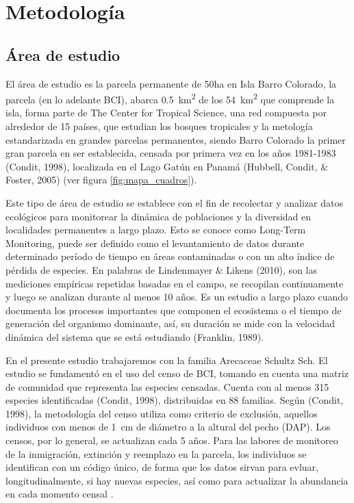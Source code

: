 \documentclass[11pt,]{article}
\begin{document}
\section{Metodología}\label{metodologuxeda}

\subsection{Área de estudio}\label{uxe1rea-de-estudio}

El área de estudio es la parcela permanente de 50ha en Isla Barro
Colorado, la parcela (en lo adelante BCI), abarca
0.5~km\textsuperscript{2} de los 54~km\textsuperscript{2} que comprende
la isla, forma parte de The Center for Tropical Science, una red
compuesta por alrededor de 15 países, que estudian los bosques
tropicales y la metología estandarizada en grandes parcelas permanentes,
siendo Barro Colorado la primer gran parcela en ser establecida, censada
por primera vez en los años 1981-1983 (Condit, 1998), localizada en el
Lago Gatún en Panamá (Hubbell, Condit, \& Foster, 2005) (ver figura
\ref{fig:mapa_cuadros}).

Este tipo de área de estudio se establece con el fin de recolectar y
analizar datos ecológicos para monitorear la dinámica de poblaciones y
la diversidad en localidades permanentes a largo plazo. Esto se conoce
como Long-Term Monitoring, puede ser definido como el levantamiento de
datos durante determinado período de tiempo en áreas contaminadas o con
un alto índice de pérdida de especies. En palabras de Lindenmayer \&
Likens (2010), son las mediciones empíricas repetidas basadas en el
campo, se recopilan continuamente y luego se analizan durante al menos
10 años. Es un estudio a largo plazo cuando documenta los procesos
importantes que componen el ecosistema o el tiempo de generación del
organismo dominante, así, su duración se mide con la velocidad dinámica
del sistema que se está estudiando (Franklin, 1989).

En el presente estudio trabajaremos con la familia Arecaceae Schultz
Sch. El estudio se fundamentó en el uso del censo de BCI, tomando en
cuenta una matriz de comunidad que representa las especies censadas.
Cuenta con al menos 315 especies identificadas (Condit, 1998),
distribuidas en 88 familias. Según (Condit, 1998), la metodología del
censo utiliza como criterio de exclusión, aquellos individuos con menos
de 1~cm de diámetro a la altural del pecho (DAP). Los censos, por lo
general, se actualizan cada 5 años. Para las labores de monitoreo de la
inmigración, extinción y reemplazo en la parcela, los individuos se
identifican con un código único, de forma que los datos sirvan para
evluar, longitudinalmente, si hay nuevas especies, así como para
actualizar la abundancia en cada momento censal .
\end{document}
